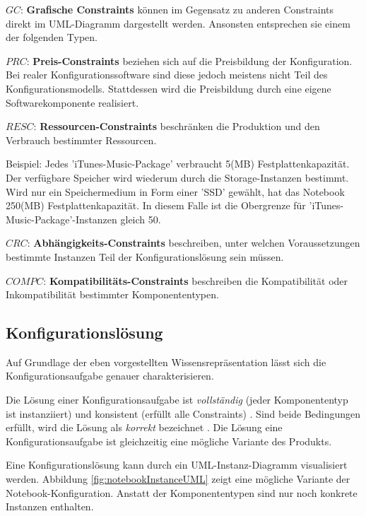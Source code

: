 \documentclass[11pt, a4paper, titlepage, listof=totoc, bibliography=totoc, index=totoc, twoside, openright, headings=normal, draft]{scrreprt}
\begin{document}
\begin{compactitem}
\item[$GC$:] \textbf{Grafische Constraints} können im Gegensatz zu anderen Constraints direkt im UML-Diagramm dargestellt werden. Ansonsten entsprechen sie einem der folgenden Typen.
\item[$PRC$:] \textbf{Preis-Constraints} beziehen sich auf die Preisbildung der Konfiguration. Bei realer Konfigurationssoftware sind diese jedoch meistens nicht Teil des Konfigurationsmodells. Stattdessen wird die Preisbildung durch eine eigene Softwarekomponente realisiert.
\item[$RESC$:] \textbf{Ressourcen-Constraints} beschränken die Produktion und den Verbrauch bestimmter Ressourcen.\vspace{0.3em}

Beispiel: Jedes 'iTunes-Music-Package' verbraucht 5(MB) Festplattenkapazität. Der verfügbare Speicher wird wiederum durch die Storage-Instanzen bestimmt. Wird nur ein Speichermedium in Form einer 'SSD' gewählt, hat das Notebook 250(MB) Festplattenkapazität. In diesem Falle ist die Obergrenze für 'iTunes-Music-Package'-Instanzen gleich 50.
\item[$CRC$:] \textbf{Abhängigkeits-Constraints} beschreiben, unter welchen Voraussetzungen bestimmte Instanzen Teil der Konfigurationslösung sein müssen.
\item[$COMPC$:] \textbf{Kompatibilitäts-Constraints} beschreiben die Kompatibilität  oder Inkompatibilität bestimmter Komponententypen.
\end{compactitem}

\subsection{Konfigurationslösung}
\label{Konfigurationslösung}
Auf Grundlage der eben vorgestellten Wissensrepräsentation lässt sich die Konfigurationsaufgabe genauer charakterisieren.

Die Lösung einer Konfigurationsaufgabe ist \emph{vollständig} (jeder Komponententyp ist instanziiert) und konsistent (erfüllt alle Constraints) \citep[angelehnt an][]{falkner11}. Sind beide Bedingungen erfüllt, wird die Lösung als \emph{korrekt} bezeichnet \citep{soininen98}. Die Lösung eine Konfigurationsaufgabe ist gleichzeitig eine mögliche Variante des Produkts.

Eine Konfigurationslösung kann durch ein UML-Instanz-Diagramm visualisiert werden.  Abbildung \ref{fig:notebookInstanceUML} zeigt eine mögliche Variante der Notebook-Konfiguration. Anstatt der Komponententypen sind nur noch konkrete Instanzen enthalten.
\end{document}
